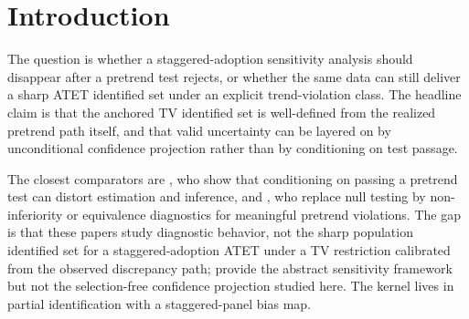 \documentclass[11pt]{article}
\theoremstyle{definition}
\theoremstyle{plain}
\theoremstyle{remark}
\begin{document}
\begin{abstract}
This proposal asks how to report staggered-adoption ATET sensitivity to trend violations when the usual pretrend diagnostic rejects or has little power. The deterministic object is a total-variation calibrated identified set that uses the observed pre-treatment discrepancy path directly, rather than conditioning on whether a pretest passed. The routine result is a sharp support-interval representation for the anchored TV class and a confidence-projection construction that is valid whenever the confidence set for the observable inputs is unconditional. The novelty-bearing claim is a selection-free dominance conjecture: in low-power local alternatives, pass/fail-gated procedures either under-cover or weakly exceed the length of the unconditional TV projection on an open class of designs. If resolved, the result would connect the pretest-caution literature to Honest-DiD style sensitivity analysis by replacing diagnostic gating with a population identified set and an unconditional breakdown band.
\end{abstract}

\section{Introduction}
The question is whether a staggered-adoption sensitivity analysis should disappear after a pretrend test rejects, or whether the same data can still deliver a sharp ATET identified set under an explicit trend-violation class. The headline claim is that the anchored TV identified set is well-defined from the realized pretrend path itself, and that valid uncertainty can be layered on by unconditional confidence projection rather than by conditioning on test passage.

The closest comparators are \citet{Roth2022PretestCaution}, who show that conditioning on passing a pretrend test can distort estimation and inference, and \citet{BilinskiHatfield2026NonInferiority}, who replace null testing by non-inferiority or equivalence diagnostics for meaningful pretrend violations. The gap is that these papers study diagnostic behavior, not the sharp population identified set for a staggered-adoption ATET under a TV restriction calibrated from the observed discrepancy path; \citet{RambachanRoth2023CrediblePT} provide the abstract sensitivity framework but not the selection-free confidence projection studied here. The kernel lives in partial identification with a staggered-panel bias map.
\end{document}
